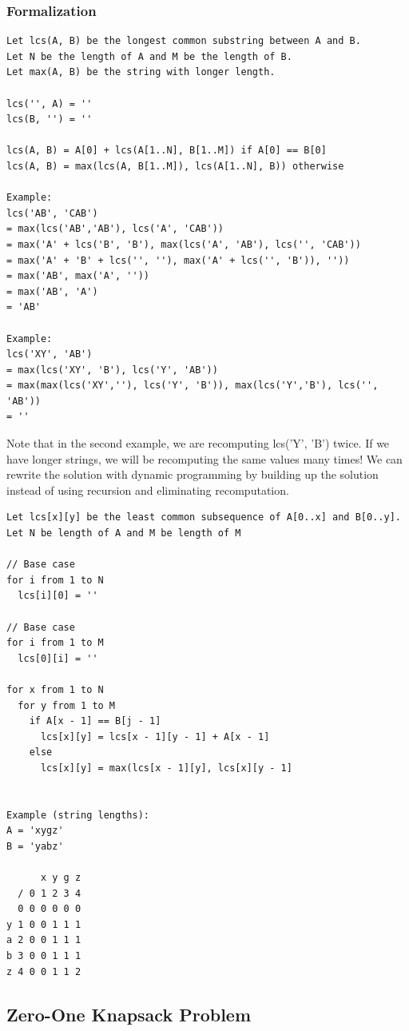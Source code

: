 \documentclass[11pt,oneside]{book}
\begin{document}
\subsubsection{Formalization}

\begin{lstlisting}
Let lcs(A, B) be the longest common substring between A and B.
Let N be the length of A and M be the length of B.
Let max(A, B) be the string with longer length.

lcs('', A) = ''
lcs(B, '') = ''

lcs(A, B) = A[0] + lcs(A[1..N], B[1..M]) if A[0] == B[0]
lcs(A, B) = max(lcs(A, B[1..M]), lcs(A[1..N], B)) otherwise

Example:
lcs('AB', 'CAB')
= max(lcs('AB','AB'), lcs('A', 'CAB'))
= max('A' + lcs('B', 'B'), max(lcs('A', 'AB'), lcs('', 'CAB'))
= max('A' + 'B' + lcs('', ''), max('A' + lcs('', 'B')), ''))
= max('AB', max('A', ''))
= max('AB', 'A')
= 'AB'

Example:
lcs('XY', 'AB')
= max(lcs('XY', 'B'), lcs('Y', 'AB'))
= max(max(lcs('XY',''), lcs('Y', 'B')), max(lcs('Y','B'), lcs('', 'AB'))
= ''
\end{lstlisting}

Note that in the second example, we are recomputing lcs('Y', 'B') twice. If we have longer strings, we will be recomputing the same values many times! We can rewrite the solution with dynamic programming by building up the solution instead of using recursion and eliminating recomputation.

\begin{lstlisting}
Let lcs[x][y] be the least common subsequence of A[0..x] and B[0..y].
Let N be length of A and M be length of M

// Base case
for i from 1 to N
  lcs[i][0] = ''

// Base case
for i from 1 to M
  lcs[0][i] = ''

for x from 1 to N
  for y from 1 to M
    if A[x - 1] == B[j - 1]
      lcs[x][y] = lcs[x - 1][y - 1] + A[x - 1]
    else
      lcs[x][y] = max(lcs[x - 1][y], lcs[x][y - 1]


Example (string lengths):
A = 'xygz'
B = 'yabz'

      x y g z
  / 0 1 2 3 4
  0 0 0 0 0 0
y 1 0 0 1 1 1
a 2 0 0 1 1 1
b 3 0 0 1 1 1
z 4 0 0 1 1 2
\end{lstlisting}



\subsection{Zero-One Knapsack Problem}
\end{document}
